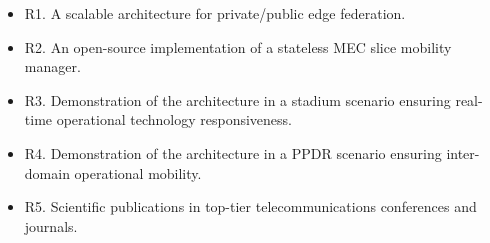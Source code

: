 \begin{itemize}
    \item R1. A scalable architecture for private/public edge federation.
    \item R2. An open-source implementation of a stateless MEC slice mobility manager.
    \item R3. Demonstration of the architecture in a stadium scenario ensuring real-time operational technology responsiveness.
    \item R4. Demonstration of the architecture in a PPDR scenario ensuring inter-domain operational mobility.
    \item R5. Scientific publications in top-tier telecommunications conferences and journals.
\end{itemize}